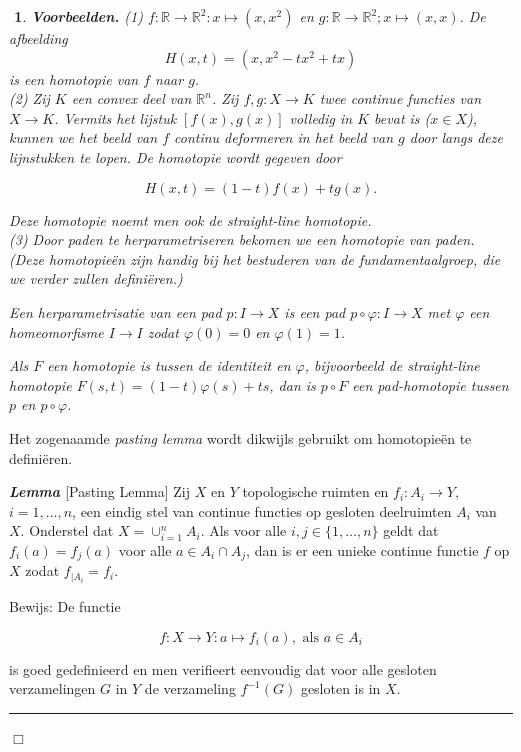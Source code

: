 \documentclass[12pt]{book}
\newcommand{\R}{\mathbb{R}}
\newcommand{\bew}{{\sc Bewijs: }}
\newcommand{\B}{\rule{1mm}{0mm} \hfill $\Box$ }
\newenvironment{lem}{\begin{lemh}{\em {\bf Lemma }}}{\end{lemh}}
\newtheorem{vbnh}[stelh]{$\!\!$}
\newenvironment{vbn}{\begin{vbnh} \em {\bf Voorbeelden.}}{\end{vbnh}}
\begin{document}
\begin{vbn} \label{vb1deel2} (1) $f:\R \to \R^2: x\mapsto (x,x^2)$ en $g:\R \to \R^2; x\mapsto (x,x)$. De afbeelding
$$H(x,t)=(x,x^2-tx^2+tx)$$
is een homotopie van $f$ naar $g$.\\

(2) Zij $K$ een convex deel van $\R^n$. Zij $f,g:X\to K$ twee continue functies van $X\to K$.
Vermits het lijstuk $[f(x),g(x)]$ volledig in $K$ bevat is ($x \in X$), kunnen we het beeld van $f$
continu deformeren in het beeld van $g$ door langs deze lijnstukken te lopen. De homotopie wordt gegeven door

$$H(x,t)=(1-t)f(x)+tg(x).$$

Deze homotopie noemt men ook de {\em straight-line} homotopie.\\

(3) Door paden te {\em herparametriseren} bekomen we een homotopie van paden. (Deze homotopie\"en zijn handig bij het bestuderen van de fundamentaalgroep, die we verder zullen defini\"eren.)

Een {\em herparametrisatie} van een pad $p:I\to X$ is een pad $p\circ \varphi: I\to X$ met $\varphi$ een homeomorfisme $I\to I$ zodat $\varphi(0)=0$ en $\varphi(1)=1$.

Als $F$ een homotopie is tussen de identiteit en $\varphi$, bijvoorbeeld de straight-line homotopie $F(s,t)=(1-t)\varphi(s)+ts$, dan is
$p\circ F$ een pad-homotopie tussen $p$ en $p \circ \varphi$.
\end{vbn}

Het zogenaamde {\em pasting lemma} wordt dikwijls gebruikt om homotopie\"en te defini\"eren.

\begin{lem}{\rm [Pasting Lemma]} 
Zij $X$ en $Y$  topologische ruimten en $f_i:A_i\to Y$, $i=1, \ldots , n$, een eindig stel van continue functies 
op gesloten deelruimten $A_i$ van $X$. Onderstel dat $X=\cup_{i=1}^{n} A_i$. Als voor alle $i, j\in \{1, \ldots, n\}$ geldt dat
$f_{i} (a)=f_{j}(a)$ voor alle $a\in A_i\cap A_j$, dan is er een unieke continue functie $f$ op $X$ zodat 
$f_{|A_i}=f_i$. \label{pasting}
\end{lem}

\bew De functie 

$$f:X\to Y: a \mapsto f_i(a), \mbox{ als } a\in A_i$$

is goed gedefinieerd en men verifieert eenvoudig dat voor alle gesloten verzamelingen $G$ in $Y$ de verzameling $f^{-1}(G)$ gesloten is in $X$. \B
\end{document}
